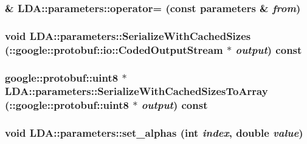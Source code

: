 \label{class_l_d_a_1_1parameters_ab0fa3fbe376bdf09d54f67ad37fa99c1}
\hypertarget{class_l_d_a_1_1parameters_a236097014789639e6b331d17ef526a25}{
\subsubsection[{operator=}]{\& LDA::parameters::operator= (const {\bf parameters} \& {\em from})}}
\label{class_l_d_a_1_1parameters_a236097014789639e6b331d17ef526a25}
\hypertarget{class_l_d_a_1_1parameters_ae7bf0cb7d3fe6194a5cacb14be149c25}{
\subsubsection[{SerializeWithCachedSizes}]{\setlength{\rightskip}{0pt plus 5cm}void LDA::parameters::SerializeWithCachedSizes (::google::protobuf::io::CodedOutputStream $\ast$ {\em output}) const}}
\label{class_l_d_a_1_1parameters_ae7bf0cb7d3fe6194a5cacb14be149c25}
\hypertarget{class_l_d_a_1_1parameters_ab24e2725db95a360ffbcbbd390051232}{
\subsubsection[{SerializeWithCachedSizesToArray}]{\setlength{\rightskip}{0pt plus 5cm}google::protobuf::uint8 $\ast$ LDA::parameters::SerializeWithCachedSizesToArray (::google::protobuf::uint8 $\ast$ {\em output}) const}}
\label{class_l_d_a_1_1parameters_ab24e2725db95a360ffbcbbd390051232}
\hypertarget{class_l_d_a_1_1parameters_a69cbcd0794eb6f3fde429705cbab8866}{
\subsubsection[{set\_\-alphas}]{\setlength{\rightskip}{0pt plus 5cm}void LDA::parameters::set\_\-alphas (int {\em index}, \/  double {\em value})}}
